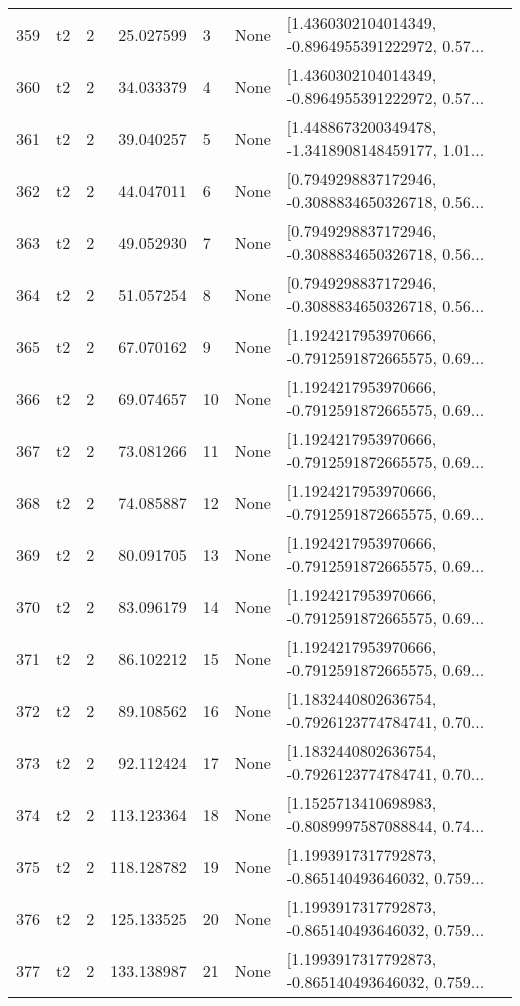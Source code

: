 \begin{tabular}{lllrlll}
359 &  t2 &   2 &    25.027599 &    3 &  None &  [1.4360302104014349, -0.8964955391222972, 0.57... \\
360 &  t2 &   2 &    34.033379 &    4 &  None &  [1.4360302104014349, -0.8964955391222972, 0.57... \\
361 &  t2 &   2 &    39.040257 &    5 &  None &  [1.4488673200349478, -1.3418908148459177, 1.01... \\
362 &  t2 &   2 &    44.047011 &    6 &  None &  [0.7949298837172946, -0.3088834650326718, 0.56... \\
363 &  t2 &   2 &    49.052930 &    7 &  None &  [0.7949298837172946, -0.3088834650326718, 0.56... \\
364 &  t2 &   2 &    51.057254 &    8 &  None &  [0.7949298837172946, -0.3088834650326718, 0.56... \\
365 &  t2 &   2 &    67.070162 &    9 &  None &  [1.1924217953970666, -0.7912591872665575, 0.69... \\
366 &  t2 &   2 &    69.074657 &   10 &  None &  [1.1924217953970666, -0.7912591872665575, 0.69... \\
367 &  t2 &   2 &    73.081266 &   11 &  None &  [1.1924217953970666, -0.7912591872665575, 0.69... \\
368 &  t2 &   2 &    74.085887 &   12 &  None &  [1.1924217953970666, -0.7912591872665575, 0.69... \\
369 &  t2 &   2 &    80.091705 &   13 &  None &  [1.1924217953970666, -0.7912591872665575, 0.69... \\
370 &  t2 &   2 &    83.096179 &   14 &  None &  [1.1924217953970666, -0.7912591872665575, 0.69... \\
371 &  t2 &   2 &    86.102212 &   15 &  None &  [1.1924217953970666, -0.7912591872665575, 0.69... \\
372 &  t2 &   2 &    89.108562 &   16 &  None &  [1.1832440802636754, -0.7926123774784741, 0.70... \\
373 &  t2 &   2 &    92.112424 &   17 &  None &  [1.1832440802636754, -0.7926123774784741, 0.70... \\
374 &  t2 &   2 &   113.123364 &   18 &  None &  [1.1525713410698983, -0.8089997587088844, 0.74... \\
375 &  t2 &   2 &   118.128782 &   19 &  None &  [1.1993917317792873, -0.865140493646032, 0.759... \\
376 &  t2 &   2 &   125.133525 &   20 &  None &  [1.1993917317792873, -0.865140493646032, 0.759... \\
377 &  t2 &   2 &   133.138987 &   21 &  None &  [1.1993917317792873, -0.865140493646032, 0.759... \\

\end{tabular}
